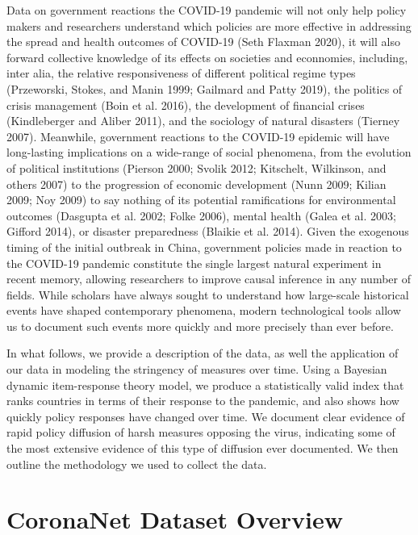 \documentclass[]{article}
\begin{document}
Data on government reactions the COVID-19 pandemic will not only help policy makers and researchers understand which policies are more effective in addressing the spread and health outcomes of COVID-19 (Seth Flaxman 2020), it will also forward collective knowledge of its effects on societies and econnomies, including, inter alia, the relative responsiveness of different political regime types (Przeworski, Stokes, and Manin 1999; Gailmard and Patty 2019), the politics of crisis management (Boin et al. 2016), the development of financial crises (Kindleberger and Aliber 2011), and the sociology of natural disasters (Tierney 2007). Meanwhile, government reactions to the COVID-19 epidemic will have long-lasting implications on a wide-range of social phenomena, from the evolution of political institutions (Pierson 2000; Svolik 2012; Kitschelt, Wilkinson, and others 2007) to the progression of economic development (Nunn 2009; Kilian 2009; Noy 2009) to say nothing of its potential ramifications for environmental outcomes (Dasgupta et al. 2002; Folke 2006), mental health (Galea et al. 2003; Gifford 2014), or disaster preparedness (Blaikie et al. 2014). Given the exogenous timing of the initial outbreak in China, government policies made in reaction to the COVID-19 pandemic constitute the single largest natural experiment in recent memory, allowing researchers to improve causal inference in any number of fields. While scholars have always sought to understand how large-scale historical events have shaped contemporary phenomena, modern technological tools allow us to document such events more quickly and more precisely than ever before.

In what follows, we provide a description of the data, as well the application of our data in modeling the stringency of measures over time. Using a Bayesian dynamic item-response theory model, we produce a statistically valid index that ranks countries in terms of their response to the pandemic, and also shows how quickly policy responses have changed over time. We document clear evidence of rapid policy diffusion of harsh measures opposing the virus, indicating some of the most extensive evidence of this type of diffusion ever documented. We then outline the methodology we used to collect the data.

\hypertarget{coronanet-dataset-overview}{%
\section{CoronaNet Dataset Overview}\label{coronanet-dataset-overview}}
\end{document}
